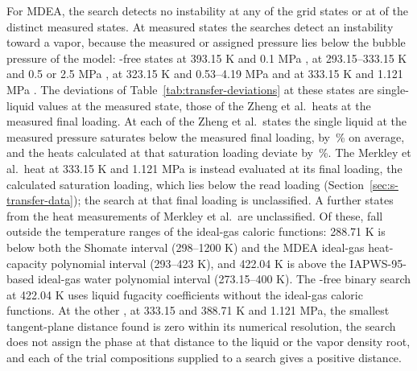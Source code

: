 \documentclass[a4paper,11pt]{article}
\begin{document}
For MDEA, the search detects no instability at any of the  grid states or at  of the  distinct measured states.
At  measured states the searches detect an instability toward a vapor, because the measured or assigned pressure lies below the bubble pressure of the model:  \COtwo-free states at 393.15 K and 0.1 MPa \cite{sobrinoViscosityDensityMeasurements2016},  at 293.15--333.15 K and 0.5 or 2.5 MPa \cite{bottingerOnlineNMRSpectroscopic2008},  at 323.15 K and 0.53--4.19 MPa \cite{zhengCO2HeatAbsorption2020} and  at 333.15 K and 1.121 MPa \cite{merkleyEnthalpiesAbsorptionCarbon1987}.
The deviations of Table~\ref{tab:transfer-deviations} at these states are single-liquid values at the measured state, those of the Zheng et al.\ heats at the measured final loading.
At each of the  Zheng et al.\ states the single liquid at the measured pressure saturates below the measured final loading, by \,\% on average, and the heats calculated at that saturation loading deviate by \,\%.
The Merkley et al.\ heat at 333.15 K and 1.121 MPa is instead evaluated at its final loading, the calculated saturation loading, which lies below the read loading (Section~\ref{sec:s-transfer-data}); the search at that final loading is unclassified.
A further  states from the heat measurements of Merkley et al.\ are unclassified.
Of these,  fall outside the temperature ranges of the ideal-gas caloric functions: 288.71 K is below both the \COtwo{} Shomate interval (298--1200 K) and the MDEA ideal-gas heat-capacity polynomial interval (293--423 K), and 422.04 K is above the IAPWS-95-based ideal-gas water polynomial interval (273.15--400 K).
The \COtwo-free binary search at 422.04 K uses liquid fugacity coefficients without the ideal-gas caloric functions.
At the other , at 333.15 and 388.71 K and 1.121 MPa, the smallest tangent-plane distance found is zero within its numerical resolution, the search does not assign the phase at that distance to the liquid or the vapor density root, and each of the  trial compositions supplied to a search gives a positive distance.
\end{document}
